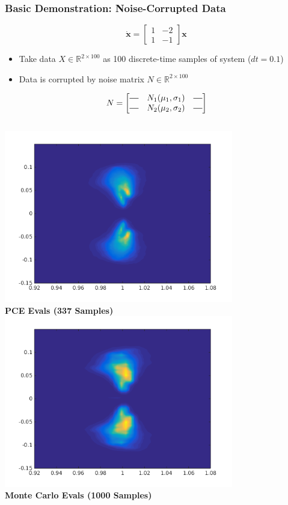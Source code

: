 \documentclass[9pt]{beamer}
\newcommand{\bv}[1]{\mathbf{#1}}
\begin{document}
\begin{frame}
\frametitle{Basic Demonstration: Noise-Corrupted Data}
\label{sec-4-3}

\newcommand*{\horzbar}{\rule[.5ex]{2.5ex}{0.5pt}}
\begin{equation*}
\dot{\bv{x}} =  \begin{bmatrix} 1 & -2 \\ 1 & -1 \end{bmatrix} \bv{x}
\end{equation*}

\begin{itemize}
\item Take data $X \in \mathbb{R}^{2\times100}$ as 100 discrete-time samples of system ($dt = 0.1$)
\item Data is corrupted by noise matrix $N \in \mathbb{R}^{2\times100}$
\end{itemize}

\begin{equation*}
N = \begin{bmatrix} \horzbar & N_1(\mu_1,\sigma_1) & \horzbar \\ \horzbar & N_2(\mu_2,\sigma_2) & \horzbar \end{bmatrix}
\end{equation*}

\begin{columns}[c]
    \centering
    \includegraphics[width=0.75\textwidth]{NoisyEigsPCE} \\
    {\bf PCE Evals (337 Samples)}
    \centering
    \includegraphics[width=0.75\textwidth]{NoisyEigsMC} \\
    {\bf Monte Carlo Evals (1000 Samples)}
\end{columns}
\end{frame}
\end{document}
